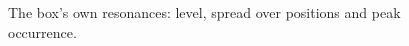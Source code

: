 \begin{figure}[t]
\centering

\caption{The box's own resonances: level, spread over positions and peak occurrence.}
\label{fig:box_resonances}
\end{figure}
